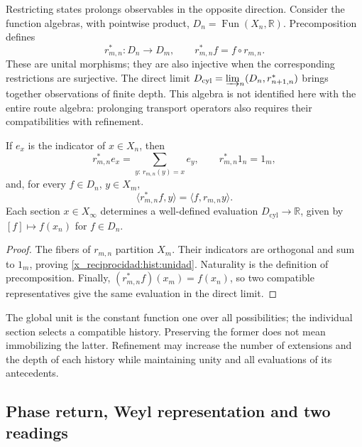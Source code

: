 Restricting states prolongs observables in the opposite direction.
Consider the function algebras, with pointwise product,
\(D_n=\operatorname{Fun}(X_n,\mathbb R)\). Precomposition defines
\begin{equation}
 r_{m,n}^*:D_n\longrightarrow D_m,
 \qquad r_{m,n}^*f=f\circ r_{m,n}.
 \label{x_reciprocidad:hist:precomposicion}
\end{equation}
These are unital morphisms; they are also injective when the corresponding
restrictions are surjective. The direct limit
\(D_{\mathrm{cyl}}=\varinjlim_n(D_n,r_{n+1,n}^*)\) brings together
observations of finite depth. This algebra is not identified here
with the entire route algebra: prolonging transport operators also requires
their compatibilities with refinement.

\begin{lemma}
If \(e_x\) is the indicator of \(x\in X_n\), then
\begin{equation}
 r_{m,n}^*e_x=\sum_{y:\,r_{m,n}(y)=x}e_y,
 \qquad r_{m,n}^*1_n=1_m,
 \label{x_reciprocidad:hist:unidad}
\end{equation}
and, for every \(f\in D_n\), \(y\in X_m\),
\[
 \langle r_{m,n}^*f,y\rangle=\langle f,r_{m,n}y\rangle.
\]
Each section \(x\in X_\infty\) determines a well-defined evaluation
\(D_{\mathrm{cyl}}\to\mathbb R\), given by \([f]\mapsto f(x_n)\)
for \(f\in D_n\).
\end{lemma}
\begin{proof}
The fibers of \(r_{m,n}\) partition \(X_m\). Their
indicators are orthogonal and sum to \(1_m\), proving
\eqref{x_reciprocidad:hist:unidad}. Naturality is the definition of precomposition.
Finally, \((r_{m,n}^*f)(x_m)=f(x_n)\), so two compatible
representatives give the same evaluation in the direct limit.
\end{proof}

The global unit is the constant function one over all possibilities;
the individual section selects a compatible history. Preserving the
former does not mean immobilizing the latter. Refinement may increase
the number of extensions and the depth of each history while maintaining
unity and all evaluations of its antecedents.

\subsection{Phase return, Weyl representation and two readings}
\label{x_reciprocidad:hist:puente-lecturas}

